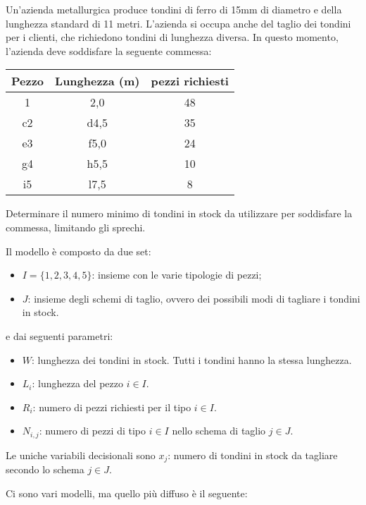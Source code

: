 Un'azienda metallurgica produce tondini di ferro di 15mm di diametro e della lunghezza standard di 11 metri. L'azienda si occupa anche del taglio dei tondini per i clienti, che richiedono tondini di lunghezza diversa. In questo momento, l'azienda deve soddisfare la seguente commessa:

\begin{table}[htbp]
	\centering
	\begin{tabular}{|c|c|c|}
		\hline
		Pezzo & Lunghezza (m) & pezzi richiesti \\ \hline
		1     & 2,0           & 48              \\ \hline
		c2    & d4,5          & 35              \\ \hline
		e3    & f5,0          & 24              \\ \hline
		g4    & h5,5          & 10              \\ \hline
		i5    & l7,5          & 8               \\ \hline
	\end{tabular}
\end{table}

Determinare il numero minimo di tondini in stock da utilizzare per soddisfare la commessa, limitando gli sprechi.

Il modello è composto da due set:
\begin{itemize}
	\item $I = \{1,2,3,4,5\}$: insieme con le varie tipologie di pezzi;
	\item $J$: insieme degli schemi di taglio, ovvero dei possibili modi di tagliare i tondini in stock.
\end{itemize}

e dai seguenti parametri:

\begin{itemize}
	\item $W$: lunghezza dei tondini in stock. Tutti i tondini hanno la stessa lunghezza.
	\item $L_i$: lunghezza del pezzo $i \in I$.
	\item $R_i$: numero di pezzi richiesti per il tipo $i \in I$.
	\item $N_{i,j}$: numero di pezzi di tipo $i \in I$ nello schema di taglio $j \in J$.
\end{itemize}

Le uniche variabili decisionali sono $x_j$: numero di tondini in stock da tagliare secondo lo schema $j \in J$.

Ci sono vari modelli, ma quello più diffuso è il seguente:

